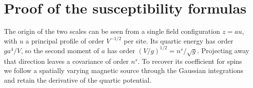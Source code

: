 \documentclass[11pt]{article}
\numberwithin{equation}{section}
\newcommand{\E}{\mathbb E}
\newcommand{\ip}[2]{\langle #1,#2\rangle}
\begin{document}

\section{Proof of the susceptibility formulas}\label{sec:proof}

The origin of the two scales can be seen from a single field
configuration $z=au$, with $u$ a principal profile of order
$V^{-1/2}$ per site. Its quartic energy has order $ga^4/V$, so the
second moment of $a$ has order $(V/g)^{1/2}=n^s/\sqrt g$. Projecting
away that direction leaves a covariance of order $n^s$. To recover its
coefficient for spins we follow a spatially varying magnetic source
through the Gaussian integrations and retain the derivative of the
quartic potential.
\end{document}

